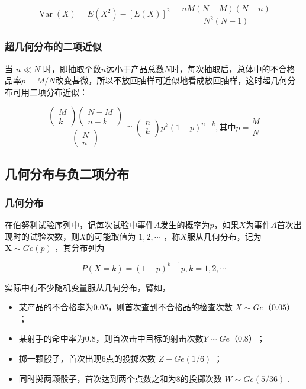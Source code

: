 \[
\operatorname{Var}(X)=E\left(X^{2}\right)-[E(X)]^{2}=\frac{n M(N-M)(N-n)}{N^{2}(N-1)}
\]

\subsubsection{超几何分布的二项近似}

当 $n \ll N$ 时，即抽取个数$ n $远小于产品总数$ N $时，每次抽取后，总体中的不合格品率$ p=M/N $改变甚微，所以不放回抽样可近似地看成放回抽样，这时超几何分布可用二项分布近似：

\begin{equation}
\frac{\left( 
	\begin{array}{c}
	{M} \\ 
	{k}
	\end{array}
	\right) \left( 
	\begin{array}{c}
	{N-M} \\ 
	{n-k}
	\end{array}
	\right)}{\left( 
	\begin{array}{l}
	{N} \\ 
	{n}
	\end{array}
	\right)} \cong \left( 
\begin{array}{l}
{n} \\ 
{k}
\end{array}
\right) p^{k}(1-p)^{n-k}, \text{其中} p=\frac{M}{N}  \label{eq:2.4.7}
\end{equation}

\subsection{几何分布与负二项分布}

\subsubsection{几何分布}

在伯努利试验序列中，记每次试验中事件$ A $发生的概率为$ p $，如果$ X $为事件$ A $首次出现时的试验次数，则$ X $的可能取值为 $1,2, \cdots$ ，称$ X $服从几何分布，记为 $\boldsymbol{X} \sim G e(p)$ ，其分布列为

\begin{equation}
P(X=k)=(1-p)^{k-1} p, k=1,2, \cdots \label{eq:2.4.8}
\end{equation}

实际中有不少随机变量服从几何分布，臂如，

\begin{itemize}
	\item 某产品的不合格率为0.05，则首次查到不合格品的检查次数 $X \sim Ge（0.05）$ ；
	\item 某射手的命中率为0.8，则首次击中目标的射击次数$ Y\sim Ge（0.8） $；
	\item 掷一颗骰子，首次出现6点的投掷次数 $Z-G e(1 / 6)$ ；
	\item 同时掷两颗骰子，首次达到两个点数之和为8的投掷次数 $W \sim G e(5 / 36)$ .
\end{itemize}


